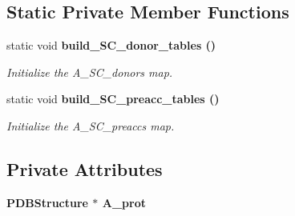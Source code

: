 \subsection*{Static Private Member Functions}
\begin{CompactItemize}
\item 
static void \bf{build\_\-SC\_\-donor\_\-tables} ()\label{classSimSite3D_1_1HbondGeometry_65a97cfb3b7745f402c1742c47d83866}

\begin{CompactList}\small\item\em Initialize the A\_\-SC\_\-donors map. \item\end{CompactList}\item 
static void \bf{build\_\-SC\_\-preacc\_\-tables} ()\label{classSimSite3D_1_1HbondGeometry_3d28b9c70a52f5b6897c94147b860f14}

\begin{CompactList}\small\item\em Initialize the A\_\-SC\_\-preaccs map. \item\end{CompactList}\end{CompactItemize}
\subsection*{Private Attributes}
\begin{CompactItemize}
\item 
\bf{PDBStructure} $\ast$ \textbf{A\_\-prot}\label{classSimSite3D_1_1HbondGeometry_8da82662a17685bfe0ce02f2d4d6ba6a}

\end{CompactItemize}
